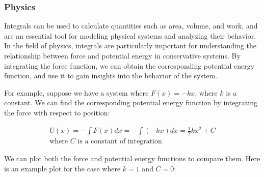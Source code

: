 \documentclass[13pt,a4paper]{report}
\begin{document}
\subsubsection{Physics}
Integrals can be used to calculate quantities such as area, volume, and work, and are an essential tool for modeling physical systems and analyzing their behavior. In the field of physics, integrals are particularly important for understanding the relationship between force and potential energy in conservative systems. By integrating the force function, we can obtain the corresponding potential energy function, and use it to gain insights into the behavior of the system.

For example, suppose we have a system where $F(x) = -kx$, where $k$ is a constant. We can find the corresponding potential energy function by integrating the force with respect to position:

\begin{gather*}
U(x) = -\int F(x) dx = -\int (-kx) dx = \frac{1}{2}kx^2 + C\\
\text{where } C \text{ is a constant of integration}
\end{gather*}

We can plot both the force and potential energy functions to compare them. Here is an example plot for the case where $k=1$ and $C=0$:
\end{document}
